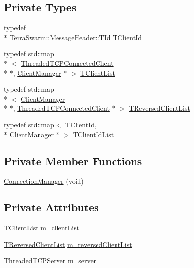 \subsection*{Private Types}
\begin{DoxyCompactItemize}
\item 
typedef \\*
\hyperlink{class_terra_swarm_1_1_message_header_ab55de822fadad758edcd8f36bd07676e}{Terra\-Swarm\-::\-Message\-Header\-::\-T\-Id} \hyperlink{class_connection_manager_a0c3634c02b95af84a477b253fcf2b29a}{T\-Client\-Id}
\item 
typedef std\-::map\\*
$<$ \hyperlink{class_threaded_t_c_p_connected_client}{Threaded\-T\-C\-P\-Connected\-Client} \\*
$\ast$, \hyperlink{class_client_manager}{Client\-Manager} $\ast$ $>$ \hyperlink{class_connection_manager_a7b6865543285e3b27b981a739fd0db18}{T\-Client\-List}
\item 
typedef std\-::map\\*
$<$ \hyperlink{class_client_manager}{Client\-Manager} \\*
$\ast$, \hyperlink{class_threaded_t_c_p_connected_client}{Threaded\-T\-C\-P\-Connected\-Client} $\ast$ $>$ \hyperlink{class_connection_manager_aa35cf836145608197dbe4201b115991c}{T\-Reversed\-Client\-List}
\item 
typedef std\-::map$<$ \hyperlink{class_connection_manager_a0c3634c02b95af84a477b253fcf2b29a}{T\-Client\-Id}, \\*
\hyperlink{class_client_manager}{Client\-Manager} $\ast$ $>$ \hyperlink{class_connection_manager_a78c371deff0ac4add801b3c64216a467}{T\-Client\-Id\-List}
\end{DoxyCompactItemize}
\subsection*{Private Member Functions}
\begin{DoxyCompactItemize}
\item 
\hyperlink{class_connection_manager_a7928f3e95b4e88b01c11eaf3e8089ee7}{Connection\-Manager} (void)
\end{DoxyCompactItemize}
\subsection*{Private Attributes}
\begin{DoxyCompactItemize}
\item 
\hyperlink{class_connection_manager_a7b6865543285e3b27b981a739fd0db18}{T\-Client\-List} \hyperlink{class_connection_manager_ad9da7334bc0a1ed0f152f5998b46268a}{m\-\_\-client\-List}
\item 
\hyperlink{class_connection_manager_aa35cf836145608197dbe4201b115991c}{T\-Reversed\-Client\-List} \hyperlink{class_connection_manager_aae27a14334d4b84076231534196e75eb}{m\-\_\-reversed\-Client\-List}
\item 
\hyperlink{class_threaded_t_c_p_server}{Threaded\-T\-C\-P\-Server} \hyperlink{class_connection_manager_a8858415ddb04364d4697f7ea00aa2977}{m\-\_\-server}
\end{DoxyCompactItemize}
